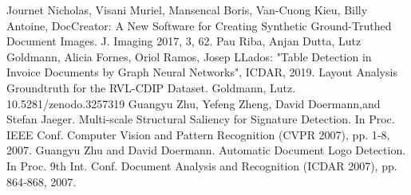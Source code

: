 \documentclass[runningheads]{llncs}
\begin{document}
\begin{thebibliography}{8}
  {Journet Nicholas, Visani Muriel, Mansencal Boris, Van-Cuong Kieu, Billy Antoine, DocCreator: A New Software for Creating Synthetic Ground-Truthed Document Images. J. Imaging 2017, 3, 62.}
  {Pau Riba, Anjan Dutta, Lutz Goldmann, Alicia Fornes, Oriol Ramos, Josep LLados: "Table Detection in Invoice Documents by Graph Neural Networks", ICDAR, 2019.}
  {Layout Analysis Groundtruth for the RVL-CDIP Dataset. Goldmann, Lutz. 10.5281/zenodo.3257319}
  {Guangyu Zhu, Yefeng Zheng, David Doermann,and Stefan Jaeger. Multi-scale Structural Saliency for Signature Detection. In Proc. IEEE Conf. Computer Vision and Pattern Recognition (CVPR 2007), pp. 1‐8, 2007.}
  {Guangyu Zhu and David Doermann. Automatic Document Logo Detection. In Proc. 9th Int. Conf. Document Analysis and Recognition (ICDAR 2007), pp. 864‐868, 2007.}

\end{thebibliography}
\end{document}
